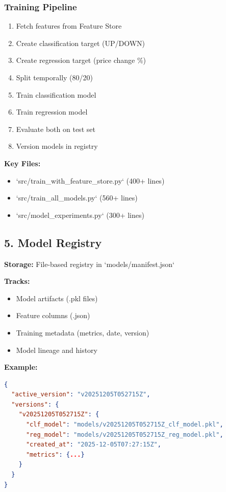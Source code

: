 \subsubsection{Training Pipeline}
\begin{enumerate}
    \item Fetch features from Feature Store
    \item Create classification target (UP/DOWN)
    \item Create regression target (price change \%)
    \item Split temporally (80/20)
    \item Train classification model
    \item Train regression model
    \item Evaluate both on test set
    \item Version models in registry
\end{enumerate}

\textbf{Key Files:}
\begin{itemize}
    \item `src/train\_with\_feature\_store.py` (400+ lines)
    \item `src/train\_all\_models.py` (560+ lines)
    \item `src/model\_experiments.py` (300+ lines)
\end{itemize}

\subsection{5. Model Registry}

\textbf{Storage:} File-based registry in `models/manifest.json`

\textbf{Tracks:}
\begin{itemize}
    \item Model artifacts (.pkl files)
    \item Feature columns (.json)
    \item Training metadata (metrics, date, version)
    \item Model lineage and history
\end{itemize}

\textbf{Example:}
\begin{lstlisting}[language=json]
{
  "active_version": "v20251205T052715Z",
  "versions": {
    "v20251205T052715Z": {
      "clf_model": "models/v20251205T052715Z_clf_model.pkl",
      "reg_model": "models/v20251205T052715Z_reg_model.pkl",
      "created_at": "2025-12-05T07:27:15Z",
      "metrics": {...}
    }
  }
}
\end{lstlisting}

